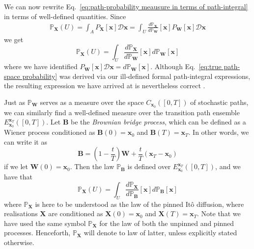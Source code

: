 We can now rewrite Eq.~\ref{eq:path-probability meausure in terms of path-integral} in terms of well-defined quantities. Since
\begin{equation}
\begin{aligned}
\mathbb{P}_\mathbf{X}(U)  =  \int_A P_\mathbf{X}[\mathbf{x}] \mathcal{D} \mathbf{x} 
 = \int_U \frac{d \mathbb{P}_\mathbf{X}}{d \mathbb{P}_\mathbf{W}}[\mathbf{x}] P_\mathbf{W}[\mathbf{x}] \mathcal{D} \mathbf{x} 
\end{aligned}
\end{equation}
we get
\begin{equation} \label{eq:true path-space probability}
\mathbb{P}_\mathbf{X}(U) = \int_U \frac{d \mathbb{P}_\mathbf{X}}{d \mathbb{P}_\mathbf{W}}[\mathbf{x}] d \mathbb{P}_\mathbf{W}[\mathbf{x}]
\end{equation}
where we have identified $P_\mathbf{W}[\mathbf{x}] \mathcal{D} \mathbf{x} = d \mathbb{P}_\mathbf{W}[\mathbf{x}]$. Although Eq.~\ref{eq:true path-space probability} was derived via our ill-defined formal path-integral expressions, the resulting expression we have arrived at is nevertheless correct \citep{beskosMCMCMETHODSDIFFUSION2008, hairerAnalysisSPDEsArising2005, hairerAnalysisSPDEsArising2007}.

Just as $\mathbb{P}_\mathbf{W}$ serves as a measure over the space $C_{\mathbf{x}_0}([0,T])$ of stochastic paths, we can similarly find a well-defined measure over the transition path ensemble $E_{\mathbf{x}_0}^{\mathbf{x}_T}([0,T])$. Let $\mathbf{B}$ be the \textit{Brownian bridge process}, which can be defined as a Wiener process conditioned as $\mathbf{B}(0) = \mathbf{x}_0$ and $\mathbf{B}(T) = \mathbf{x}_T$. In other words, we can write it as
\begin{equation}
	\mathbf{B} = \left(1 - \frac{t}{T}\right) \mathbf{W} + \frac{t}{T} (\mathbf{x}_T - \mathbf{x}_0)
\end{equation}
if we let $\mathbf{W}(0) = \mathbf{x}_0$. Then the law $\mathbb{P}_\mathbf{B}$ is defined over $E_{\mathbf{x}_0}^{\mathbf{x}_T}([0,T])$, and we have that \citep{beskosMCMCMETHODSDIFFUSION2008}
\begin{equation} \label{eq:true path-space probability of TPE}
\mathbb{P}_\mathbf{X}(U) = \int_U \frac{d \mathbb{P}_\mathbf{X}}{d \mathbb{P}_\mathbf{B}}[\mathbf{x}] d \mathbb{P}_\mathbf{B}[\mathbf{x}]
\end{equation}
where $\mathbb{P}_\mathbf{X}$ is here to be understood as the law of the pinned It\^{o} diffusion, where realisations $\mathbf{X}$ are conditioned as $\mathbf{X}(0) = \mathbf{x}_0$ and $\mathbf{X}(T) = \mathbf{x}_T$. Note that we have used the same symbol $\mathbb{P}_\mathbf{X}$ for the law of both the unpinned and pinned processes. Henceforth, $\mathbb{P}_\mathbf{X}$ will denote to law of latter, unless explicitly stated otherwise.

